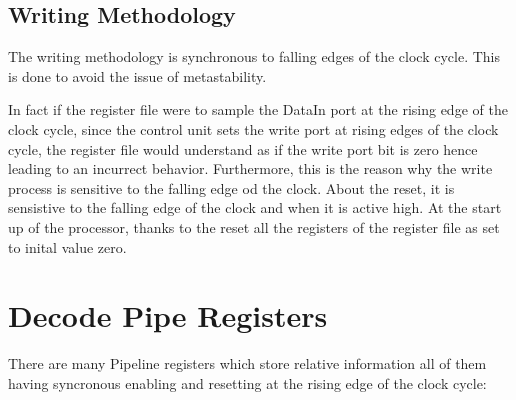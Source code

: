         \subsection{Writing Methodology}
        The writing methodology is synchronous to falling edges of the clock cycle. This is done to avoid the issue of metastability.

        In fact if the register file were to sample the DataIn port at the rising edge of the clock cycle, since the control unit sets the write port
        at rising edges of the clock cycle, the register file would understand as if the write port bit is zero hence leading to an incurrect behavior. Furthermore, 
        this is the reason why the write process is sensitive to the falling edge od the clock.
        About the reset, it is sensistive to the falling edge of the clock and when it is active high. At the start up of the processor, thanks to the reset all the
        registers of the register file as set to inital value zero.

\section {Decode Pipe Registers}

    There are many Pipeline registers which store relative information all of them having syncronous enabling and resetting at the rising edge of the clock cycle:

